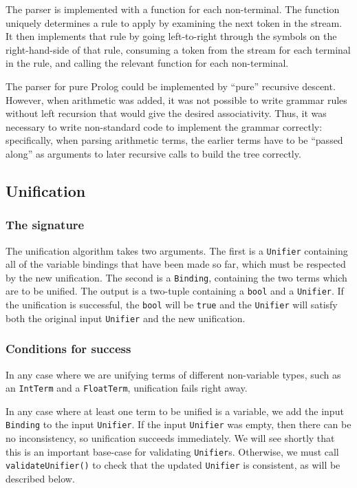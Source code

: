 \documentclass[12pt]{article}
\begin{document}
The parser is implemented with a function for each non-terminal. 
The function uniquely determines a rule to apply by examining the next token in the stream. 
It then implements that rule by going left-to-right through the symbols on the right-hand-side of that rule, consuming a token from the stream for each terminal in the rule, and calling the relevant function for each non-terminal.


The parser for pure Prolog could be implemented by ``pure'' recursive descent. 
However, when arithmetic was added, it was not possible to write grammar rules without left recursion that would give the desired associativity. 
Thus, it was necessary to write non-standard code to implement the grammar correctly: specifically, when parsing arithmetic terms, the earlier terms have to be ``passed along'' as arguments to later recursive calls to build the tree correctly.

\subsection{Unification}

\subsubsection{The signature}

The unification algorithm takes two arguments. 
The first is a \verb|Unifier| containing all of the variable bindings that have been made so far, which must be respected by the new unification. 
The second is a \verb|Binding|, containing the two terms which are to be unified. 
The output is a two-tuple containing a \verb|bool| and a \verb|Unifier|. 
If the unification is successful, the \verb|bool| will be \verb|true| and the \verb|Unifier| will satisfy both the original input \verb|Unifier| and the new unification.

\subsubsection{Conditions for success}

In any case where we are unifying terms of different non-variable types, such as an \verb|IntTerm| and a \verb|FloatTerm|, unification fails right away. 

In any case where at least one term to be unified is a variable, we add the input \verb|Binding| to the input \verb|Unifier|. 
If the input \verb|Unifier| was empty, then there can be no inconsistency, so unification succeeds immediately. 
We will see shortly that this is an important base-case for validating \verb|Unifier|s. 
Otherwise, we must call \verb|validateUnifier()| to check that the updated \verb|Unifier| is consistent, as will be described below.
\end{document}
